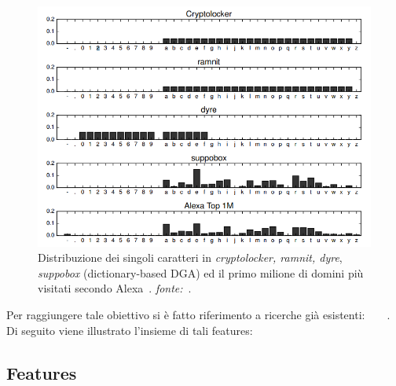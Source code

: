 \begin{figure}[!bp]
    \centering
    \includegraphics[width=\columnwidth]{figures/chardistr.png}
    \caption{Distribuzione dei singoli caratteri in \textit{cryptolocker, ramnit, dyre}, \textit{suppobox} (dictionary-based DGA) ed il primo milione di domini più visitati secondo Alexa~\cite{amazon:alexa}.
\textit{fonte:}~\cite{deepdga}. \label{fig:Chardistr}}
\end{figure}


Per raggiungere tale obiettivo si è fatto riferimento a ricerche già esistenti:~\cite{180232}~\cite{Yadav:2010:DAG:1879141.1879148}~\cite{Yadav:2012:DAG:2428696.2428722}~\cite{Schiavoni2014}. Di seguito viene illustrato l'insieme di tali features:

\subsection{Features}
\label{randomforestinterno}

